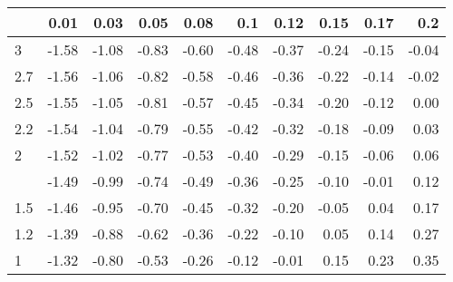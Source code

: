 
\begin{tabular}{lrrrrrrrrr}
\toprule
  & 0.01 & 0.03 & 0.05 & 0.08 & 0.1 & 0.12 & 0.15 & 0.17 & 0.2\\
\midrule
3 & -1.58 & -1.08 & -0.83 & -0.60 & -0.48 & -0.37 & -0.24 & -0.15 & -0.04\\
2.7 & -1.56 & -1.06 & -0.82 & -0.58 & -0.46 & -0.36 & -0.22 & -0.14 & -0.02\\
2.5 & -1.55 & -1.05 & -0.81 & -0.57 & -0.45 & -0.34 & -0.20 & -0.12 & 0.00\\
2.2 & -1.54 & -1.04 & -0.79 & -0.55 & -0.42 & -0.32 & -0.18 & -0.09 & 0.03\\
2 & -1.52 & -1.02 & -0.77 & -0.53 & -0.40 & -0.29 & -0.15 & -0.06 & 0.06\\
\addlinespace
1.7 & -1.49 & -0.99 & -0.74 & -0.49 & -0.36 & -0.25 & -0.10 & -0.01 & 0.12\\
1.5 & -1.46 & -0.95 & -0.70 & -0.45 & -0.32 & -0.20 & -0.05 & 0.04 & 0.17\\
1.2 & -1.39 & -0.88 & -0.62 & -0.36 & -0.22 & -0.10 & 0.05 & 0.14 & 0.27\\
1 & -1.32 & -0.80 & -0.53 & -0.26 & -0.12 & -0.01 & 0.15 & 0.23 & 0.35\\
\bottomrule
\end{tabular}
